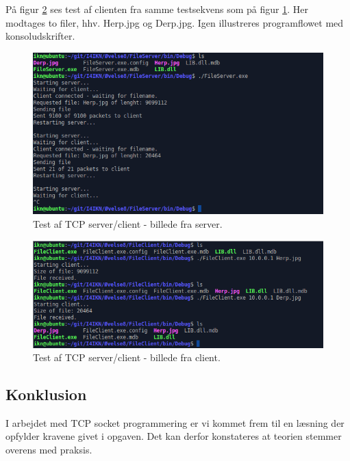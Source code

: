 På figur \ref{fig:tcp_h2} ses test af clienten fra samme testsekvens som på figur \ref{fig:tcp_h1}. Her modtages to filer, hhv. Herp.jpg og Derp.jpg. Igen illustreres programflowet med konsoludskrifter. 

\begin{figure}[H]
	\centering
	\includegraphics[width=0.9\linewidth]{figs/tcp_h1}
	\caption{Test af TCP server/client - billede fra server.}
	\label{fig:tcp_h1}
\end{figure}

\begin{figure}[H]
	\centering
	\includegraphics[width=0.9\linewidth]{figs/tcp_h2}
	\caption{Test af TCP server/client - billede fra client.}
	\label{fig:tcp_h2}
\end{figure}

\subsection{Konklusion}
I arbejdet med TCP socket programmering er vi kommet frem til en læsning der opfylder kravene givet i opgaven. Det kan derfor konstateres at teorien stemmer overens med praksis.